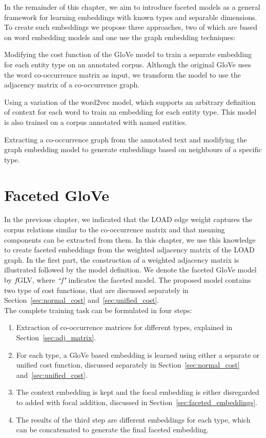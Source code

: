 In the remainder of this chapter, we aim to introduce faceted models as a general framework for learning embeddings with known types and separable dimensions. To create such embeddings we propose three approaches, two of which are based on word embedding models and one use the graph embedding techniques: 
\begin{compactenum}
\item Modifying the cost function of the GloVe model to train a separate embedding for each entity type on an annotated corpus. Although the original GloVe uses the word co-occurrence matrix as input, we transform the model to use the adjacency matrix of a co-occurrence graph. 
\item Using a variation of the word2vec model, which supports an arbitrary definition of context for each word to train an embedding for each entity type. This model is also trained on a corpus annotated with named entities.
\item Extracting a co-occurrence graph from the annotated text and modifying the graph embedding model to generate embeddings based on neighbours of a specific type. 
\end{compactenum}
\section{Faceted GloVe}\label{sec:faceted_glove}
In the previous chapter, we indicated that the LOAD edge weight captures the corpus relations similar to the co-occurrence matrix and that meaning components can be extracted from them. In this chapter, we use this knowledge to create faceted embeddings from the weighted adjacency matrix of the LOAD graph. In the first part, the construction of a weighted adjacency matrix is illustrated followed by the model definition. We denote the faceted GloVe model by $f$GLV, where \emph{``f"} indicates the faceted model. The proposed model contains two type of cost functions, that are discussed separately in Section~\ref{sec:normal_cost} and~\ref{sec:unified_cost}. \\
The complete training task can be formulated in four steps: 
 \begin{enumerate}        
 \item Extraction of co-occurrence matrices for different types, explained in Section~\ref{sec:adj_matrix}. 
 \item For each type, a GloVe based embedding is learned using either a separate or unified cost function, discussed separately in Section~\ref{sec:normal_cost} and~\ref{sec:unified_cost}. 
 \item The context embedding is kept and the focal embedding is either disregarded to added with focal addition, discussed in Section~\ref{sec:faceted_embeddings}.
 \item The results of the third step are different embeddings for each type, which can be concatenated to generate the final faceted embedding. 
 \end{enumerate}
